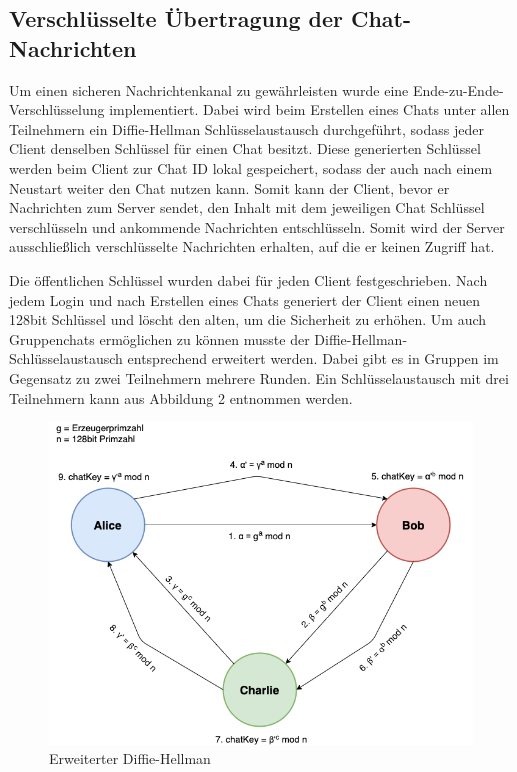 \author{Troy Keßler, Michael Angermeier}
\subsection{Verschlüsselte Übertragung der Chat-Nachrichten}\label{encryption}
Um einen sicheren Nachrichtenkanal zu gewährleisten wurde eine Ende-zu-Ende-Verschlüsselung implementiert. Dabei wird beim Erstellen eines Chats unter allen Teilnehmern ein Diffie-Hellman Schlüsselaustausch durchgeführt, sodass jeder Client denselben Schlüssel für einen Chat besitzt. Diese generierten Schlüssel werden beim Client zur Chat ID lokal gespeichert, sodass der auch nach einem Neustart weiter den Chat nutzen kann. Somit kann der Client, bevor er Nachrichten zum Server sendet, den Inhalt mit dem jeweiligen Chat Schlüssel verschlüsseln und ankommende Nachrichten entschlüsseln. Somit wird der Server ausschließlich verschlüsselte Nachrichten erhalten, auf die er keinen Zugriff hat.

Die öffentlichen Schlüssel wurden dabei für jeden Client festgeschrieben. Nach jedem Login und nach Erstellen eines Chats generiert der Client einen neuen 128bit Schlüssel und löscht den alten, um die Sicherheit zu erhöhen. Um auch Gruppenchats ermöglichen zu können musste der Diffie-Hellman-Schlüsselaustausch entsprechend erweitert werden. Dabei gibt es in Gruppen im Gegensatz zu zwei Teilnehmern mehrere Runden. Ein Schlüsselaustausch mit drei Teilnehmern kann aus Abbildung 2 entnommen werden.

\begin{figure}[h]
  \centering
  \includegraphics[width=\textwidth]{dh.png}
  
  \caption{Erweiterter Diffie-Hellman}
\end{figure}


